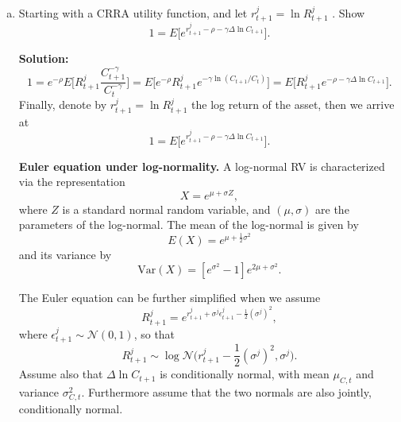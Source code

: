 \documentclass[11pt]{extarticle}
\theoremstyle{plain}
\theoremstyle{definition}
\begin{document}
\begin{enumerate}[(a)]
\item Starting with a CRRA utility function, and let $r_{t+1}^j = \ln R_{t+1}^j$ . Show 
\begin{equation*}
	1 = E\bigg[ e^{r_{t+1}^j - \rho -\gamma \Delta \ln  C_{t+1}} \bigg].
\end{equation*}

\textbf{Solution:}
\begin{equation*}
	1 = e^{-\rho} E\bigg[R_{t+1}^j \frac{C_{t+1}^{-\gamma}}{C_t^{-\gamma}} \bigg] = E\bigg[e^{-\rho}  R_{t+1}^j e^{-\gamma \ln(C_{t+1} / C_t)} \bigg] = E\bigg[ R_{t+1}^j e^{- \rho -\gamma  \Delta \ln  C_{t+1}} \bigg].
\end{equation*}
Finally, denote by $r_{t+1}^j = \ln R_{t+1}^j$ the log return of the asset, then we arrive at 
\begin{equation*}
	1 = E\bigg[ e^{r_{t+1}^j - \rho -\gamma \Delta \ln  C_{t+1}} \bigg].
\end{equation*}


\vspace{5mm}
\noindent
\textbf{Euler equation under log-normality.} A log-normal RV is characterized via the representation
\begin{equation*}
	X = e^{\mu + \sigma Z},
\end{equation*}
where $Z$ is a standard normal random variable, and $(\mu,\sigma)$ are the parameters of the log-normal. The mean of the log-normal is given by
\begin{equation*}
	E(X) = e^{\mu + \frac{1}{2} \sigma^2}
\end{equation*}
and its variance by
\begin{equation*}
	\text{Var}(X) = [e^{\sigma^2}-1] e^{2\mu + \sigma^2}.
\end{equation*}


The Euler equation can be further simplified when we assume
\begin{equation*}
	R_{t+1}^j = e^{r_{t+1}^j + \sigma^j \epsilon_{t+1}^j - \frac{1}{2} (\sigma^j)^2},
\end{equation*}
where $\epsilon_{t+1}^j \sim \mathcal{N}(0,1)$, so that 
\begin{equation*}
	R_{t+1}^j  \sim \log \mathcal{N} \bigg(r_{t+1}^j - \frac{1}{2} (\sigma^j)^2, \sigma^j\bigg).
\end{equation*}
Assume also that $\Delta \ln  C_{t+1}$ is conditionally normal, with mean $\mu_{C,t}$ and variance $\sigma_{C,t}^2$. Furthermore assume that the two normals are also jointly, conditionally normal.


\end{enumerate}
\end{document}

